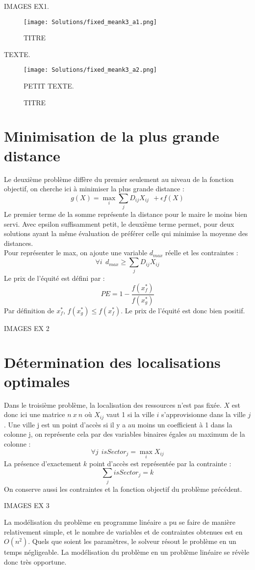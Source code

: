 \documentclass[12pt]{article}
\begin{document}
\begin{minipage}{\textwidth}
IMAGES EX1.
\begin{figure}[H]
\centering
\texttt{[image: Solutions/fixed\_meank3\_a1.png]}
\caption{TITRE}
\end{figure}
TEXTE.
\centering
\begin{figure}[H]
\texttt{[image: Solutions/fixed\_meank3\_a2.png]}
\caption{TITRE}
{\footnotesize PETIT TEXTE.\par}
\end{figure}
\end{minipage}


\pagebreak

\section{Minimisation de la plus grande distance}
Le deuxième problème diffère du premier seulement au niveau de la fonction objectif, on cherche ici à minimiser la plus grande distance :
\[g(X) = \max_i \sum_j D_{ij} X_{ij} \:\: + \epsilon f(X)\]
Le premier terme de la somme représente la distance pour le maire le moins bien servi.
Avec epsilon suffisamment petit, le deuxième terme permet, pour deux solutions ayant la même évaluation de préférer celle qui minimise la moyenne des distances.
\\
Pour représenter le max, on ajoute une variable $d_{max}$ réelle et les contraintes :
\[\forall i \:\: d_{max} \geq \sum_j D_{ij}X_{ij}\]
Le prix de l'équité est défini par :
\[PE = 1 - \frac{f(x^*_f)}{f(x^*_g)}\]
Par définition de $x^*_f$, $f(x^*_g) \leq f(x^*_f)$. Le prix de l'équité est donc bien positif.

IMAGES EX 2

\section{Détermination des localisations optimales}
Dans le troisième problème, la localisation des ressources n'est pas fixée.
$X$ est donc ici une matrice $n\:x\:n$ où $X_{ij}$ vaut 1 si la ville $i$ s'approvisionne dans la ville $j$.
Une ville j est un point d'accès si il y a au moins un coefficient à 1 dans la colonne j, on représente cela par des variables binaires égales au maximum de la colonne :
\[\forall j \:\: isSector_j = \max_i X_{ij}\]
La présence d'exactement $k$ point d'accès est représentée par la contrainte :
\[\sum_j isSector_j = k\]
On conserve aussi les contraintes et la fonction objectif du problème précédent.

IMAGES EX 3

La modélisation du problème en programme linéaire a pu se faire de manière relativement simple, et le nombre de variables et de contraintes obtenues est en $O(n^2)$. Quels que soient les paramètres, le solveur résout le problème en un temps négligeable. La modélisation du problème en un problème linéaire se révèle donc très opportune.
\end{document}
